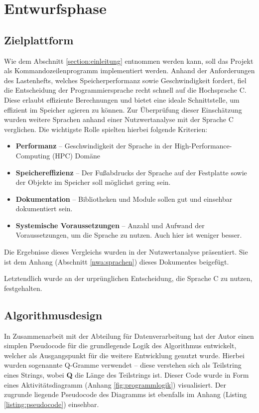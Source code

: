 \section{Entwurfsphase}
\label{section:entwurfsphase}
\subsection{Zielplattform}
Wie dem Abschnitt \ref{section:einleitung} entnommen werden kann, soll das Projekt als Kommandozeilenprogramm
implementiert werden. Anhand der Anforderungen des Lastenhefts, welches Speicherperformanz sowie Geschwindigkeit fordert,
fiel die Entscheidung der Programmiersprache recht schnell auf die Hochsprache C. Diese erlaubt effiziente Berechnungen und bietet eine ideale Schnittstelle, um effizient im Speicher agieren zu können.
Zur Überprüfung dieser Einschätzung wurden weitere Sprachen anhand einer
Nutzwertanalyse mit der Sprache C verglichen. Die wichtigste Rolle spielten hierbei folgende Kriterien:
\begin{itemize}
    \item \textbf{Performanz} -- Geschwindigkeit der Sprache in der High-Performance-Computing (HPC) Domäne
    \item \textbf{Speichereffizienz} -- Der Fußabdrucks der Sprache auf der Festplatte sowie der Objekte im Speicher soll möglichst gering sein.
    \item \textbf{Dokumentation} -- Bibliotheken und Module sollen gut und einsehbar dokumentiert sein.
    \item \textbf{Systemische Voraussetzungen} -- Anzahl und Aufwand der Voraussetzungen, um die Sprache zu nutzen. Auch hier ist weniger besser.
\end{itemize}

Die Ergebnisse dieses Vergleichs wurden in der Nutzwertanalyse präsentiert.
Sie ist dem Anhang (Abschnitt \ref{nwa:sprachen})  dieses Dokumentes beigefügt.\par
Letztendlich wurde an der urprünglichen Entscheidung, die Sprache C zu nutzen, festgehalten.

\subsection{Algorithmusdesign}
In Zusammenarbeit mit der Abteilung für Datenverarbeitung hat der Autor einen simplen
Pseudocode für die grundlegende Logik des Algorithmus entwickelt, welcher als Ausgangspunkt
für die weitere Entwicklung genutzt wurde. Hierbei wurden sogenannte Q-Gramme verwendet --
diese verstehen sich als Teilstring eines Strings, wobei \textbf{Q} die Länge des Teilstrings ist. Dieser Code wurde in Form eines
Aktivitätsdiagramm (Anhang \ref{fig:programmlogik}) visualisiert. Der zugrunde liegende  Pseudocode des Diagramms ist ebenfalls im Anhang (Listing \ref{listing:pseudocode}) einsehbar.


